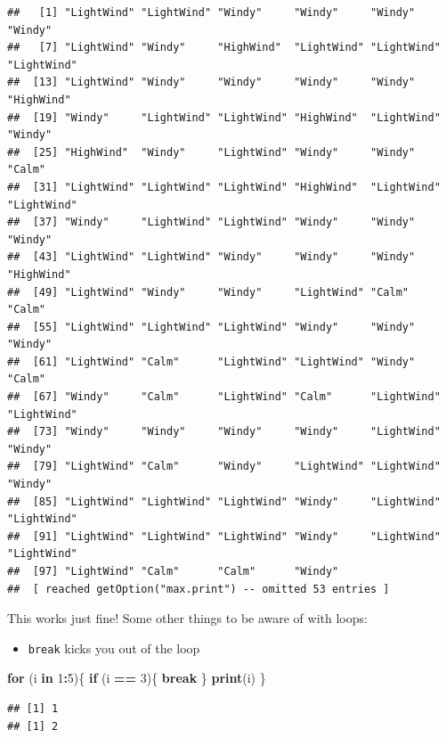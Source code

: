 \documentclass[
]{book}
\newenvironment{Shaded}{\begin{snugshade}}{\end{snugshade}}
\newcommand{\ControlFlowTok}[1]{\textcolor[rgb]{0.13,0.29,0.53}{\textbf{#1}}}
\newcommand{\DecValTok}[1]{\textcolor[rgb]{0.00,0.00,0.81}{#1}}
\newcommand{\KeywordTok}[1]{\textcolor[rgb]{0.13,0.29,0.53}{\textbf{#1}}}
\newcommand{\NormalTok}[1]{#1}
\newcommand{\OperatorTok}[1]{\textcolor[rgb]{0.81,0.36,0.00}{\textbf{#1}}}
\newcommand{\StringTok}[1]{\textcolor[rgb]{0.31,0.60,0.02}{#1}}
\providecommand{\tightlist}{%
  \setlength{\itemsep}{0pt}\setlength{\parskip}{0pt}}
\theoremstyle{definition}
\theoremstyle{definition}
\theoremstyle{definition}
\theoremstyle{remark}
\begin{document}
\begin{verbatim}
##   [1] "LightWind" "LightWind" "Windy"     "Windy"     "Windy"     "Windy"    
##   [7] "LightWind" "Windy"     "HighWind"  "LightWind" "LightWind" "LightWind"
##  [13] "LightWind" "Windy"     "Windy"     "Windy"     "Windy"     "HighWind" 
##  [19] "Windy"     "LightWind" "LightWind" "HighWind"  "LightWind" "Windy"    
##  [25] "HighWind"  "Windy"     "LightWind" "Windy"     "Windy"     "Calm"     
##  [31] "LightWind" "LightWind" "LightWind" "HighWind"  "LightWind" "LightWind"
##  [37] "Windy"     "LightWind" "LightWind" "Windy"     "Windy"     "Windy"    
##  [43] "LightWind" "LightWind" "Windy"     "Windy"     "Windy"     "HighWind" 
##  [49] "LightWind" "Windy"     "Windy"     "LightWind" "Calm"      "Calm"     
##  [55] "LightWind" "LightWind" "LightWind" "Windy"     "Windy"     "Windy"    
##  [61] "LightWind" "Calm"      "LightWind" "LightWind" "Windy"     "Calm"     
##  [67] "Windy"     "Calm"      "LightWind" "Calm"      "LightWind" "LightWind"
##  [73] "Windy"     "Windy"     "Windy"     "Windy"     "LightWind" "Windy"    
##  [79] "LightWind" "Calm"      "Windy"     "LightWind" "LightWind" "Windy"    
##  [85] "LightWind" "LightWind" "LightWind" "Windy"     "LightWind" "LightWind"
##  [91] "LightWind" "LightWind" "LightWind" "Windy"     "LightWind" "LightWind"
##  [97] "LightWind" "Calm"      "Calm"      "Windy"    
##  [ reached getOption("max.print") -- omitted 53 entries ]
\end{verbatim}

This works just fine! Some other things to be aware of with loops:

\begin{itemize}
\tightlist
\item
  \texttt{break} kicks you out of the loop
\end{itemize}

\begin{Shaded}
\begin{Highlighting}[]
\ControlFlowTok{for}\NormalTok{ (i }\ControlFlowTok{in} \DecValTok{1}\OperatorTok{:}\DecValTok{5}\NormalTok{)\{}
    \ControlFlowTok{if}\NormalTok{ (i }\OperatorTok{==}\StringTok{ }\DecValTok{3}\NormalTok{)\{ }
      \ControlFlowTok{break} 
\NormalTok{      \}}
  \KeywordTok{print}\NormalTok{(i)}
\NormalTok{\}}
\end{Highlighting}
\end{Shaded}

\begin{verbatim}
## [1] 1
## [1] 2
\end{verbatim}
\end{document}
